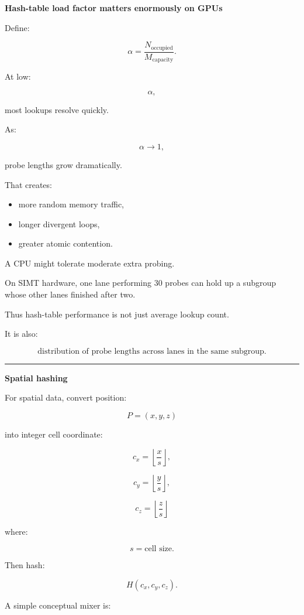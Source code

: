 \textbf{Hash-table load factor matters enormously on GPUs}

Define:

\[
\boxed{
\alpha=
\frac{
N_{\text{occupied}}
}{
M_{\text{capacity}}
}.
}
\]

At low:

\[
\alpha,
\]

most lookups resolve quickly.

As:

\[
\alpha\rightarrow1,
\]

probe lengths grow dramatically.

That creates:

\begin{itemize}
\tightlist
\item
  more random memory traffic,
\item
  longer divergent loops,
\item
  greater atomic contention.
\end{itemize}

A CPU might tolerate moderate extra probing.

On SIMT hardware, one lane performing 30 probes can hold up a subgroup whose other lanes finished after two.

Thus hash-table performance is not just average lookup count.

It is also:

\[
\boxed{
\text{distribution of probe lengths across lanes in the same subgroup}.
}
\]

\begin{center}\rule{0.5\linewidth}{0.5pt}\end{center}

\textbf{Spatial hashing}

For spatial data, convert position:

\[
P=(x,y,z)
\]

into integer cell coordinate:

\[
c_x=
\left\lfloor
\frac{x}{s}
\right\rfloor,
\]

\[
c_y=
\left\lfloor
\frac{y}{s}
\right\rfloor,
\]

\[
c_z=
\left\lfloor
\frac{z}{s}
\right\rfloor
\]

where:

\[
s=\text{cell size}.
\]

Then hash:

\[
H(c_x,c_y,c_z).
\]

A simple conceptual mixer is:

